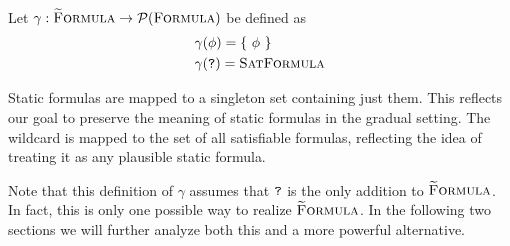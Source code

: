 \begin{definition}[Concretization]~\\
    Let $\gamma : \textup{\textsc{\ensuremath{\widetilde{\text{F}}}ormula}} \rightarrow \mathcal{P}(\textup{\textsc{Formula}})$ be defined as
    \begin{align*}
    &\gamma(\phi) = \{~ \phi ~\} \\
    &\gamma(\textup{\texttt{?}}) = \textup{\textsc{SatFormula}}
    \end{align*}
\end{definition}

Static formulas are mapped to a singleton set containing just them.
This reflects our goal to preserve the meaning of static formulas in the gradual setting.
The wildcard is mapped to the set of all satisfiable formulas, reflecting the idea of treating it as any plausible static formula.

Note that this definition of $\gamma$ assumes that $\textup{\texttt{?}}$ is the only addition to $\textup{\textsc{\ensuremath{\widetilde{\text{F}}}ormula}}$.
In fact, this is only one possible way to realize $\textup{\textsc{\ensuremath{\widetilde{\text{F}}}ormula}}$.
In the following two sections we will further analyze both this and a more powerful alternative.